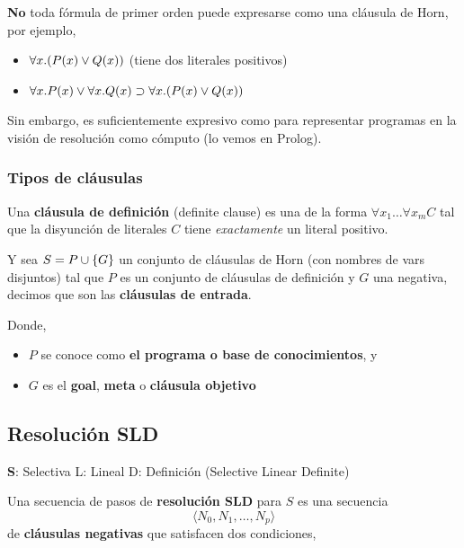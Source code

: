 \documentclass{report}
\theoremstyle{definition} %
\newenvironment{nota}[1]
    {\begin{leftbar}\textbf{#1}}
    {\end{leftbar}}
\begin{document}
\textbf{No} toda fórmula de primer orden puede expresarse como una cláusula de
Horn, por ejemplo,

\begin{itemize}
    \item $\forall x . (P(x) \vee Q(x))$ (tiene dos literales positivos)
    \item \(
    \impl
    {
        \paratodo{x}{P(x)}
        \vee
        \paratodo{x}{Q(x)}
    }
    {
        \paratodo{x}{(P(x) \vee Q(x))}
    }
    \)
\end{itemize}

Sin embargo, es suficientemente expresivo como para representar programas en la
visión de resolución como cómputo (lo vemos en Prolog).

\subsubsection{Tipos de cláusulas}

Una \textbf{cláusula de definición} (definite clause) es una de la forma
$\forall x_1 \dots \forall x_m C$ tal que la disyunción de literales $C$
tiene \textit{exactamente} un literal positivo.

Y sea $S = P \cup \{ G \}$ un conjunto de cláusulas de Horn (con nombres de
vars disjuntos) tal que $P$ es un conjunto de cláusulas de definición y $G$
una negativa, decimos que son las \textbf{cláusulas de entrada}.

Donde,
\begin{itemize}
    \item $P$ se conoce como \textbf{el programa o base de conocimientos}, y
    \item $G$ es el \textbf{goal}, \textbf{meta} o \textbf{cláusula
    objetivo}
\end{itemize}

\subsection{Resolución SLD}

\begin{nota}
    S: Selectiva
    L: Lineal
    D: Definición
    (Selective Linear Definite)
\end{nota}

Una secuencia de pasos de \textbf{resolución SLD} para $S$ es una secuencia
\[
\langle
    N_0, N_1, \dots, N_p
\rangle
\]
de \textbf{cláusulas negativas} que satisfacen dos condiciones,
\end{document}
